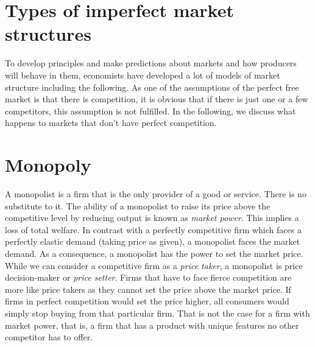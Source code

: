 \section{Types of imperfect market structures} 

To develop principles and make predictions about markets and how producers will behave in them, economists have developed a lot of models of market structure including the following.
As one of the assumptions of the perfect free market is that there is competition, it is obvious that if there is just one or a few competitors, this assumption is not fulfilled. In the following, we discuss what happens to markets that don't have perfect competition.

\section{Monopoly}\label{monopoly}

A monopolist is a firm that is the only provider of a good or service. There is no substitute to it.
The ability of a monopolist to raise its price above the competitive level by reducing output is known as \emph{market power}. This implies a loss of total welfare.
In contrast with a perfectly competitive firm which faces a perfectly elastic demand (taking
price as given), a monopolist faces the market demand. As a consequence, a monopolist has the power to set the market price. While we can consider a
competitive firm as a \emph{price taker}, a monopolist is price decision-maker or \emph{price setter}.
Firms that have to face fierce competition are more like price takers as they cannot set the price above the market price. If firms in perfect competition would set the price higher, all consumers would simply stop buying from that particular firm. That is not the case for a firm with market power, that is, a firm that has a product with unique features no other competitor has to offer.



